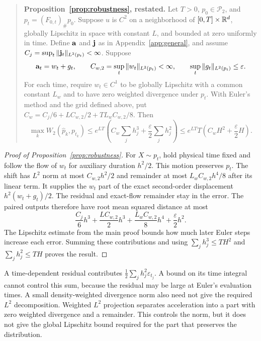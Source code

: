 \begin{quote}
\textbf{Proposition~\ref{prop:robustness}, restated.}
Let $T>0$, $p_0\in\mathcal P_2$, and $p_t=(F_{0,t})_\#p_0$. Suppose $u$ is $C^2$ on a neighborhood of $[0,T]\times\mathbb R^d$, globally Lipschitz in space with constant $L$, and bounded at zero uniformly in time. Define $\mathbf a$ and $\mathbf j$ as in Appendix~\ref{app:general}, and assume $C_j=\sup_t\|\mathbf j_t\|_{L^2(p_t)}<\infty$. Suppose
\[
 \mathbf a_t=w_t+g_t,
 \qquad C_{w,2}=\sup_t\|w_t\|_{L^2(p_t)}<\infty,
 \qquad\sup_t\|g_t\|_{L^2(p_t)}\le\varepsilon.
\]
For each time, require $w_t\in C^1$ to be globally Lipschitz with a common constant $L_w$ and to have zero weighted divergence under $p_t$. With Euler's method and the grid defined above, put
$C_w=C_j/6+LC_{w,2}/2+TL_wC_{w,2}/8$. Then
\begin{equation}
 \max_k W_2(\widehat p_k,p_{t_k})
 \le e^{LT}\left(C_w\sum_jh_j^3+
                  \frac\varepsilon2\sum_jh_j^2\right)
 \le e^{LT}T\left(C_wH^2+\frac\varepsilon2H\right).
 \label{eq:robustness-full}
\end{equation}
\end{quote}
\begin{proof}[Proof of Proposition~\ref{prop:robustness}]
\label{proof:robustness}
For $X\sim p_t$, hold physical time fixed and follow the flow of $w_t$ for auxiliary duration $h^2/2$. This motion preserves $p_t$. The shift has $L^2$ norm at most $C_{w,2}h^2/2$ and remainder at most $L_wC_{w,2}h^4/8$ after its linear term. It supplies the $w_t$ part of the exact second-order displacement $h^2(w_t+g_t)/2$. The residual and exact-flow remainder stay in the error. The paired outputs therefore have root mean squared distance at most
\[
 \frac{C_j}{6}h^3+\frac{LC_{w,2}}{2}h^3+\frac{L_wC_{w,2}}{8}h^4
 +\frac\varepsilon2h^2.
\]
The Lipschitz estimate from the main proof bounds how much later Euler steps increase each error. Summing these contributions and using $\sum_jh_j^3\le TH^2$ and $\sum_jh_j^2\le TH$ proves the result.
\end{proof}

A time-dependent residual contributes $\frac12\sum_jh_j^2\varepsilon_{t_j}$. A bound on its time integral cannot control this sum, because the residual may be large at Euler's evaluation times. A small density-weighted divergence norm also need not give the required $L^2$ decomposition. Weighted $L^2$ projection separates acceleration into a part with zero weighted divergence and a remainder. This controls the norm, but it does not give the global Lipschitz bound required for the part that preserves the distribution.

